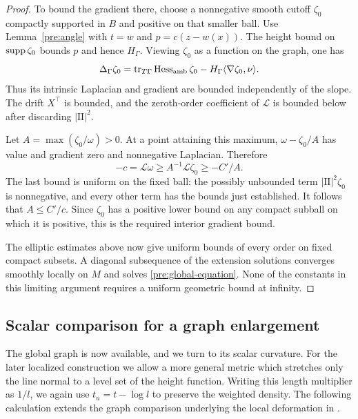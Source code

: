 \begin{proof}
To bound the gradient there, choose a nonnegative smooth cutoff
$\zeta_0$ compactly supported in $B$ and positive on that smaller ball.
Use Lemma~\ref{pre:angle} with $t=w$ and $p=c(z-w(x))$.
The height bound on $\operatorname{supp}\zeta_0$ bounds $p$ and hence $H_\Gamma$.
Viewing $\zeta_0$ as a function on the graph, one has
\[
 \Delta_\Gamma\zeta_0
   =\operatorname{tr}_{T\Gamma}\operatorname{Hess}_{\mathrm{amb}}\zeta_0
       -H_\Gamma\langle\nabla\zeta_0,\nu\rangle.
\]
Thus its intrinsic Laplacian and gradient are bounded independently of
the slope. The drift $X^\top$ is bounded, and the zeroth-order
coefficient of $\mathcal L$ is bounded below after discarding
$|\mathrm{II}|^2$.

Let $A=\max(\zeta_0/\omega)>0$. At a point attaining this maximum,
$\omega-\zeta_0/A$ has value and gradient zero and nonnegative
Laplacian. Therefore
\begin{equation}\label{pre:cutoff-angle}
 -c=\mathcal L\omega
       \ge A^{-1}\mathcal L\zeta_0\ge-C'/A.
\end{equation}
The last bound is uniform on the fixed ball: the possibly unbounded
term $|\mathrm{II}|^2\zeta_0$ is nonnegative, and every other term has
the bounds just established. It follows that $A\le C'/c$. Since
$\zeta_0$ has a positive lower bound on any compact subball on which
it is positive, this is the required interior gradient bound.

The elliptic estimates above now give uniform bounds of every order
on fixed compact subsets. A diagonal subsequence of the extension
solutions converges smoothly locally on $M$ and solves
\eqref{pre:global-equation}. None of the constants in this limiting
argument requires a uniform geometric bound at infinity.
\end{proof}

\subsection{Scalar comparison for a graph enlargement}
\label{pre:scalar-subsection}

The global graph is now available, and we turn to its scalar curvature.
For the later localized construction we allow a more general metric
which stretches only the line normal to a level set of the height function.
Writing this length multiplier as $1/l$, we again use $t_u=t-\log l$
to preserve the weighted density. The following calculation extends the
graph comparison underlying the local deformation in
\cite[Section~3.5, Lemma~3.4]{OpenAIWidth}.

